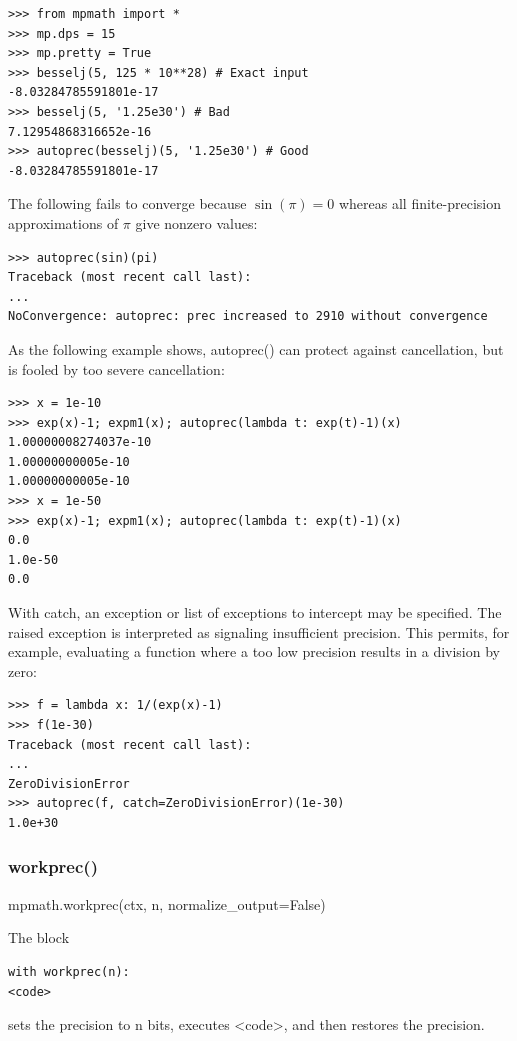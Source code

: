 \begin{lstlisting}
>>> from mpmath import *
>>> mp.dps = 15
>>> mp.pretty = True
>>> besselj(5, 125 * 10**28) # Exact input
-8.03284785591801e-17
>>> besselj(5, '1.25e30') # Bad
7.12954868316652e-16
>>> autoprec(besselj)(5, '1.25e30') # Good
-8.03284785591801e-17
\end{lstlisting}


The following fails to converge because $\sin(\pi)=0$ whereas all finite-precision approximations of $\pi$ give nonzero values:

\begin{lstlisting}
>>> autoprec(sin)(pi)
Traceback (most recent call last):
...
NoConvergence: autoprec: prec increased to 2910 without convergence
\end{lstlisting}

As the following example shows, autoprec() can protect against cancellation, but is fooled by too severe cancellation:

\begin{lstlisting}
>>> x = 1e-10
>>> exp(x)-1; expm1(x); autoprec(lambda t: exp(t)-1)(x)
1.00000008274037e-10
1.00000000005e-10
1.00000000005e-10
>>> x = 1e-50
>>> exp(x)-1; expm1(x); autoprec(lambda t: exp(t)-1)(x)
0.0
1.0e-50
0.0
\end{lstlisting}

With catch, an exception or list of exceptions to intercept may be specified. The raised exception is interpreted as signaling insufficient precision. This permits, for example, evaluating a function where a too low precision results in a division by zero:

\begin{lstlisting}
>>> f = lambda x: 1/(exp(x)-1)
>>> f(1e-30)
Traceback (most recent call last):
...
ZeroDivisionError
>>> autoprec(f, catch=ZeroDivisionError)(1e-30)
1.0e+30
\end{lstlisting}


\subsubsection{workprec()}

mpmath.workprec(ctx, n, normalize\_output=False)

The block
\begin{lstlisting}
with workprec(n):
<code>
\end{lstlisting}
sets the precision to n bits, executes <code>, and then restores the precision.

